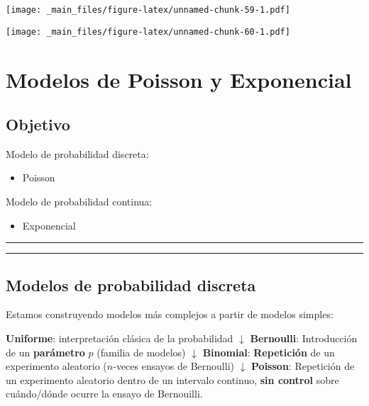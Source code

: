 \documentclass[
]{book}
\providecommand{\tightlist}{%
  \setlength{\itemsep}{0pt}\setlength{\parskip}{0pt}}
\begin{document}
\texttt{[image: \_main\_files/figure-latex/unnamed-chunk-59-1.pdf]}

\texttt{[image: \_main\_files/figure-latex/unnamed-chunk-60-1.pdf]}

\hypertarget{modelos-de-poisson-y-exponencial}{%
\chapter{Modelos de Poisson y Exponencial}\label{modelos-de-poisson-y-exponencial}}

\hypertarget{objetivo-7}{%
\section{Objetivo}\label{objetivo-7}}

Modelo de probabilidad discreta:

\begin{itemize}
\tightlist
\item
  Poisson
\end{itemize}

Modelo de probabilidad continua:

\begin{itemize}
\tightlist
\item
  Exponencial
\end{itemize}

\begin{center}\rule{0.5\linewidth}{0.5pt}\end{center}

\begin{center}\rule{0.5\linewidth}{0.5pt}\end{center}

\hypertarget{modelos-de-probabilidad-discreta}{%
\section{Modelos de probabilidad discreta}\label{modelos-de-probabilidad-discreta}}

Estamos construyendo modelos más complejos a partir de modelos simples:

\textbf{Uniforme}: interpretación clásica de la probabilidad
\(\downarrow\)
\textbf{Bernoulli}: Introducción de un \textbf{parámetro} \(p\) (familia de modelos)
\(\downarrow\)
\textbf{Binomial}: \textbf{Repetición} de un experimento aleatorio (\(n\)-veces ensayos de Bernoulli)
\(\downarrow\)
\textbf{Poisson}: Repetición de un experimento aleatorio dentro de un intervalo continuo, \textbf{sin control} sobre cuándo/dónde ocurre la ensayo de Bernouilli.
\end{document}
